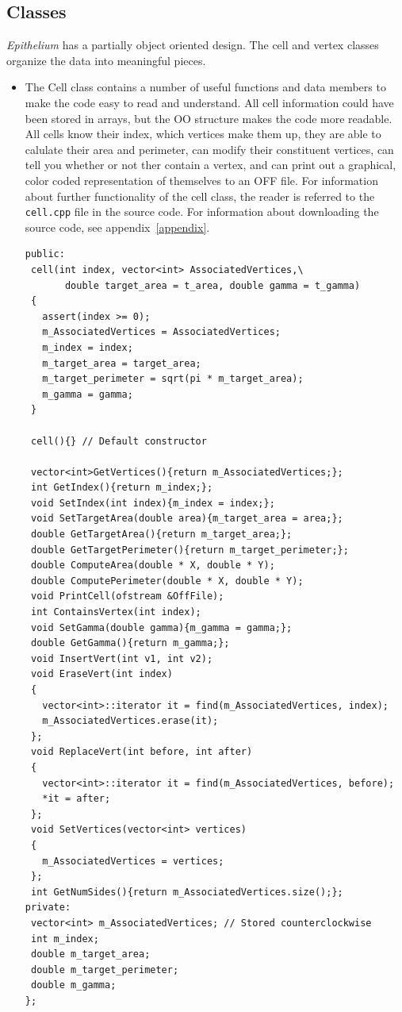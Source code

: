 \subsection{Classes}
\emph{Epithelium} has a partially object oriented design. The cell and vertex classes organize the data into meaningful pieces.
\begin{itemize}
\item The {\color{red} Cell} class contains a number of useful functions and data members to make the code easy to read and understand. All cell information could have been stored in arrays, but the OO structure makes the code more readable. All cells know their index, which vertices make them up, they are able to calulate their area and perimeter, can modify their constituent vertices, can tell you whether or not ther contain a vertex, and can print out a graphical, color coded representation of themselves to an OFF file. For information about further functionality of the cell class, the reader is referred to the \texttt{cell.cpp} file in the source code. For information about downloading the source code, see appendix~\ref{appendix}. 
\begin{lstlisting}
public:
 cell(int index, vector<int> AssociatedVertices,\
       double target_area = t_area, double gamma = t_gamma)
 {	
   assert(index >= 0);
   m_AssociatedVertices = AssociatedVertices;
   m_index = index;
   m_target_area = target_area;
   m_target_perimeter = sqrt(pi * m_target_area);
   m_gamma = gamma; 
 }
	
 cell(){} // Default constructor
	
 vector<int>GetVertices(){return m_AssociatedVertices;};
 int GetIndex(){return m_index;};
 void SetIndex(int index){m_index = index;};
 void SetTargetArea(double area){m_target_area = area;};
 double GetTargetArea(){return m_target_area;};
 double GetTargetPerimeter(){return m_target_perimeter;};
 double ComputeArea(double * X, double * Y);
 double ComputePerimeter(double * X, double * Y);
 void PrintCell(ofstream &OffFile);
 int ContainsVertex(int index);
 void SetGamma(double gamma){m_gamma = gamma;};
 double GetGamma(){return m_gamma;};
 void InsertVert(int v1, int v2);
 void EraseVert(int index)
 {
   vector<int>::iterator it = find(m_AssociatedVertices, index); 
   m_AssociatedVertices.erase(it);
 };
 void ReplaceVert(int before, int after)
 {
   vector<int>::iterator it = find(m_AssociatedVertices, before); 
   *it = after;
 };
 void SetVertices(vector<int> vertices)
 {
   m_AssociatedVertices = vertices;
 };
 int GetNumSides(){return m_AssociatedVertices.size();};
private:
 vector<int> m_AssociatedVertices; // Stored counterclockwise
 int m_index;	
 double m_target_area;
 double m_target_perimeter;
 double m_gamma;
};


\end{lstlisting}
\end{itemize}

